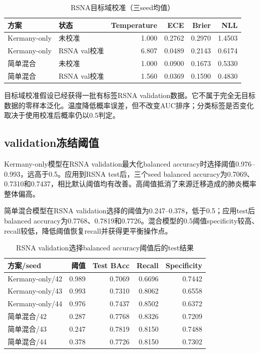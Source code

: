 \begin{table}[H]
\centering
\caption{RSNA目标域校准（三seed均值）}
\begin{tabular}{llrrrr}
\toprule 方案 & 状态 & Temperature & ECE & Brier & NLL\\\midrule
Kermany-only & 未校准 & 1.000 & 0.2762 & 0.2970 & 1.4503\\
Kermany-only & RSNA val校准 & 6.807 & 0.0489 & 0.2143 & 0.6174\\
简单混合 & 未校准 & 1.000 & 0.0900 & 0.1673 & 0.5330\\
简单混合 & RSNA val校准 & 1.560 & 0.0369 & 0.1590 & 0.4830\\\bottomrule
\end{tabular}
\end{table}

目标域校准假设已经获得一批有标签RSNA validation数据。它不属于完全无目标数据的零样本泛化。温度降低概率误差，但不改变AUC排序；分类标签是否变化取决于使用校准后概率仍以0.5判定。

\subsection{validation冻结阈值}

Kermany-only模型在RSNA validation最大化balanced accuracy时选择阈值0.976--0.993，远高于0.5。应用到RSNA test后，三个seed balanced accuracy为0.7069、0.7310和0.7437，相比默认阈值均有改善。高阈值抵消了来源迁移造成的肺炎概率整体偏高。

简单混合模型在RSNA validation选择的阈值为0.247--0.378，低于0.5；应用test后balanced accuracy为0.7768、0.7819和0.7726。混合模型的0.5阈值specificity较高、recall较低，降低阈值恢复recall并获得更平衡操作点。

\begin{table}[H]
\centering
\caption{RSNA validation选择balanced accuracy阈值后的test结果}
\begin{tabular}{lrrrr}
\toprule 方案/seed & 阈值 & Test BAcc & Recall & Specificity\\\midrule
Kermany-only/42 & 0.989 & 0.7069 & 0.6696 & 0.7442\\
Kermany-only/43 & 0.993 & 0.7310 & 0.8062 & 0.6558\\
Kermany-only/44 & 0.976 & 0.7437 & 0.8502 & 0.6372\\
简单混合/42 & 0.287 & 0.7768 & 0.8326 & 0.7209\\
简单混合/43 & 0.247 & 0.7819 & 0.8150 & 0.7488\\
简单混合/44 & 0.378 & 0.7726 & 0.8150 & 0.7302\\\bottomrule
\end{tabular}
\end{table}

